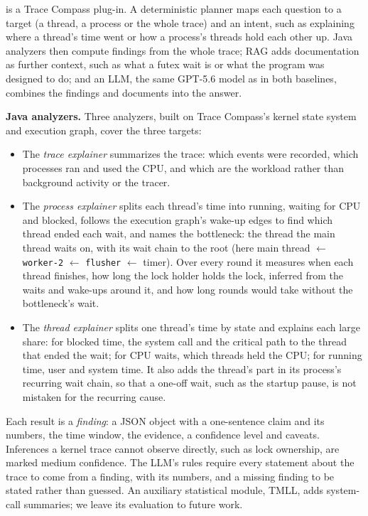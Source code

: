 \sysname is a Trace Compass plug-in. A deterministic planner maps each
question to a target (a thread, a process or the whole trace) and an
intent, such as explaining where a thread's time went or how a process's
threads hold each other up. Java analyzers then compute findings from the
whole trace; RAG adds documentation as further context, such as what a
futex wait is or what the program was designed to do; and an LLM, the same
GPT-5.6 model as in both baselines, combines the findings and documents
into the answer.

\textbf{Java analyzers.} Three analyzers, built on Trace Compass's kernel
state system and execution graph, cover the three targets:
\begin{itemize}
  \item The \emph{trace explainer} summarizes the trace: which events were
        recorded, which processes ran and used the CPU, and which are the
        workload rather than background activity or the tracer.
  \item The \emph{process explainer} splits each thread's time into
        running, waiting for CPU and blocked, follows the execution graph's
        wake-up edges to find which thread ended each wait, and names the
        bottleneck: the thread the main thread waits on, with its wait
        chain to the root (here main thread $\leftarrow$
        \texttt{worker-2} $\leftarrow$ \texttt{flusher} $\leftarrow$
        timer). Over every round it measures when each thread finishes, how
        long the lock holder holds the lock, inferred from the waits and
        wake-ups around it, and how long rounds would take without the
        bottleneck's wait.
  \item The \emph{thread explainer} splits one thread's time by state and
        explains each large share: for blocked time, the system call and
        the critical path to the thread that ended the wait; for CPU waits,
        which threads held the CPU; for running time, user and system time.
        It also adds the thread's part in its process's recurring wait
        chain, so that a one-off wait, such as the startup pause, is not
        mistaken for the recurring cause.
\end{itemize}
Each result is a \emph{finding}: a JSON object with a one-sentence claim
and its numbers, the time window, the evidence, a confidence level and
caveats. Inferences a kernel trace cannot observe directly, such as lock
ownership, are marked medium confidence. The LLM's rules require every
statement about the trace to come from a finding, with its numbers, and a
missing finding to be stated rather than guessed. An auxiliary statistical
module, TMLL, adds system-call summaries; we leave its evaluation to
future work.

